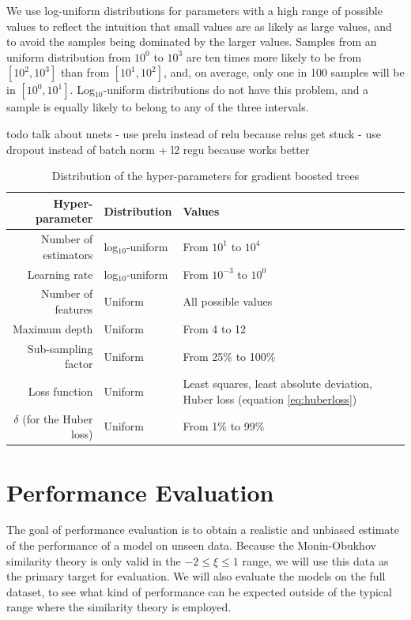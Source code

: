 \documentclass[a4paper]{book}
\begin{document}
We use log-uniform distributions for parameters with a high range of possible values to reflect the intuition that small values are as likely as large values, and to avoid the samples being dominated by the larger values. Samples from an uniform distribution from $10^0$ to $10^3$ are ten times more likely to be from $[10^2,10^3]$ than from $[10^1,10^2]$, and, on average, only one in 100 samples will be in $[10^0,10^1]$. Log$_{10}$-uniform distributions do not have this problem, and a sample is equally likely to belong to any of the three intervals.

todo talk about nnets
 - use prelu instead of relu because relus get stuck
 - use dropout instead of batch norm + l2 regu because works better

\begin{table}[]
\centering
\caption{Distribution of the hyper-parameters for gradient boosted trees}
\label{tbl:gb_hyperparams}
\begin{tabularx}{\textwidth}{r|l|X}
\toprule
\textbf{Hyper-parameter} & \textbf{Distribution} & \textbf{Values} \\ \midrule
Number of estimators & log$_{10}$-uniform & From $10^1$ to $10^4$ \\
Learning rate & log$_{10}$-uniform & From $10^{-3}$ to $10^0$ \\
Number of features & Uniform & All possible values \\
Maximum depth & Uniform & From 4 to 12 \\
Sub-sampling factor & Uniform & From 25\% to 100\% \\
Loss function & Uniform & Least squares, least absolute deviation, \newline Huber loss (equation \ref{eq:huberloss}) \\
$\delta$ (for the Huber loss) & Uniform & From 1\% to 99\% \\
\bottomrule
\end{tabularx}
\end{table}



\section{Performance Evaluation}
\label{sec:perf_eval}
The goal of performance evaluation is to obtain a realistic and unbiased estimate of the performance of a model on unseen data. Because the Monin-Obukhov similarity theory is only valid in the $-2\leq\xi\leq1$ range, we will use this data as the primary target for evaluation. We will also evaluate the models on the full dataset, to see what kind of performance can be expected outside of the typical range where the similarity theory is employed.
\end{document}
